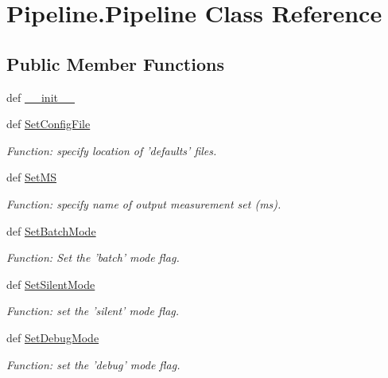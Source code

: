 \hypertarget{class_pipeline_1_1_pipeline}{\section{\-Pipeline.\-Pipeline \-Class \-Reference}
\label{class_pipeline_1_1_pipeline}
}
\subsection*{\-Public \-Member \-Functions}
\begin{DoxyCompactItemize}
\item 
def \hyperlink{class_pipeline_1_1_pipeline_a9471fe47c5f99217c0696e6eb828c2ea}{\-\_\-\-\_\-init\-\_\-\-\_\-}
\item 
def \hyperlink{class_pipeline_1_1_pipeline_ad0e2d0768b23a2d2d5e154d696a21317}{\-Set\-Config\-File}
\begin{DoxyCompactList}\small\item\em \-Function\-: specify location of 'defaults' files. \end{DoxyCompactList}\item 
def \hyperlink{class_pipeline_1_1_pipeline_aa43ebf2ad90e152edb6b92911521f6e9}{\-Set\-M\-S}
\begin{DoxyCompactList}\small\item\em \-Function\-: specify name of output measurement set (ms). \end{DoxyCompactList}\item 
def \hyperlink{class_pipeline_1_1_pipeline_a138f65f6617383b8758831b33ea42442}{\-Set\-Batch\-Mode}
\begin{DoxyCompactList}\small\item\em \-Function\-: \-Set the 'batch' mode flag. \end{DoxyCompactList}\item 
def \hyperlink{class_pipeline_1_1_pipeline_a762dfb493445bcfc9c1e44f8a93f7400}{\-Set\-Silent\-Mode}
\begin{DoxyCompactList}\small\item\em \-Function\-: set the 'silent' mode flag. \end{DoxyCompactList}\item 
def \hyperlink{class_pipeline_1_1_pipeline_adb78acb8c9e486e7eb6a7e830140efe1}{\-Set\-Debug\-Mode}
\begin{DoxyCompactList}\small\item\em \-Function\-: set the 'debug' mode flag. \end{DoxyCompactList}\item 

\end{DoxyCompactItemize}
